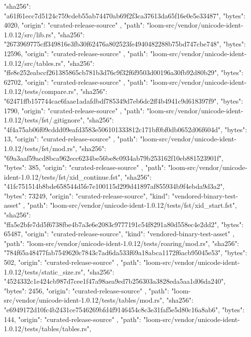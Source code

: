 {{      "sha256": "a61f61ecc7d5124c759cdeb55ab74470ab69f2f3ca37613da65f16e0e5e33487",
      "bytes": 4020,
      "origin": "curated-release-source"
    },
    {
      "path": "loom-src/vendor/unicode-ident-1.0.12/src/lib.rs",
      "sha256": "2673969775cff349816e3fb30f62476a802523fe4940482288b75bd747cbe748",
      "bytes": 12596,
      "origin": "curated-release-source"
    },
    {
      "path": "loom-src/vendor/unicode-ident-1.0.12/src/tables.rs",
      "sha256": "ffe8e252eabccf261385865cb781b3d76c9f32f6f9503d00196a30fb92d80b29",
      "bytes": 62702,
      "origin": "curated-release-source"
    },
    {
      "path": "loom-src/vendor/unicode-ident-1.0.12/tests/compare.rs",
      "sha256": "62471ffb157744cac6faae1adafdbdf785349d7eb6dc2ff4b4941c9d618397f9",
      "bytes": 1790,
      "origin": "curated-release-source"
    },
    {
      "path": "loom-src/vendor/unicode-ident-1.0.12/tests/fst/.gitignore",
      "sha256": "4f4a75ab06f09cddd09eafd3583e506101333812c171bf0bf0db0652d06f604d",
      "bytes": 13,
      "origin": "curated-release-source"
    },
    {
      "path": "loom-src/vendor/unicode-ident-1.0.12/tests/fst/mod.rs",
      "sha256": "69a3aaf59acd8bca962ecc6234be56be8c0934ab79b253162f10eb881523901f",
      "bytes": 385,
      "origin": "curated-release-source"
    },
    {
      "path": "loom-src/vendor/unicode-ident-1.0.12/tests/fst/xid_continue.fst",
      "sha256": "41fc751514b8bde658544d5fe7e100115d299d41897af855934b9f4ebda9d3a2",
      "bytes": 73249,
      "origin": "curated-release-source",
      "kind": "vendored-binary-test-asset"
    },
    {
      "path": "loom-src/vendor/unicode-ident-1.0.12/tests/fst/xid_start.fst",
      "sha256": "ffa5e2bfe7dd5f6738fbe4b7a3e6e2083c9777191c54f8291a80d558ec4e2dd2",
      "bytes": 65487,
      "origin": "curated-release-source",
      "kind": "vendored-binary-test-asset"
    },
    {
      "path": "loom-src/vendor/unicode-ident-1.0.12/tests/roaring/mod.rs",
      "sha256": "784f65a48477fab7549620c7843c7ad6da533f69a18abca1172f6acb95045e53",
      "bytes": 502,
      "origin": "curated-release-source"
    },
    {
      "path": "loom-src/vendor/unicode-ident-1.0.12/tests/static_size.rs",
      "sha256": "4524332c1e424cb987d7cee1f47a98aea9ed7b256303a3828eda5aa1d06da240",
      "bytes": 2456,
      "origin": "curated-release-source"
    },
    {
      "path": "loom-src/vendor/unicode-ident-1.0.12/tests/tables/mod.rs",
      "sha256": "e6949172d10fc4b2431ce7546269bfd4f9146454c8c3e31faf5e5d80c16a8ab6",
      "bytes": 144,
      "origin": "curated-release-source"
    },
    {
      "path": "loom-src/vendor/unicode-ident-1.0.12/tests/tables/tables.rs",
}}

